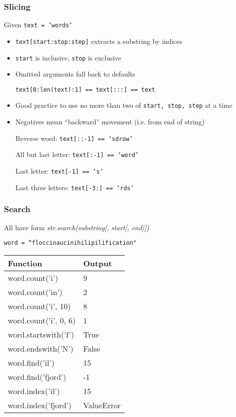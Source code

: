 \documentclass{beamer}
\begin{document}
%
%
\begin{frame}
  \frametitle{Slicing}

  Given \texttt{text = 'words'}

  \begin{itemize}
    \item \texttt{text[start:stop:step]} extracts a substring by indices
    \item \texttt{start} is inclusive, \texttt{stop} is exclusive
    \item Omitted arguments fall back to defaults

      \texttt{text[0:len(text):1] == text[:::] == text}

    \item Good practice to use no more than two of \texttt{start, stop, step} at a time

    \item Negatives mean ``backward'' movement (i.e. from end of string)
    
      Reverse word: \texttt{text[::-1] == `sdrow'}

      All but last letter: \texttt{text[:-1] == `word'}

      Last letter: \texttt{text[-1] == `s'}

      Last three letters: \texttt{text[-3:] == `rds'}
  \end{itemize}

\end{frame}

%
%
\begin{frame}
  \frametitle{Search}
  All have form \textit{str.search(substring[, start[, end]])}
  
  \texttt{word = ``floccinaucinihilipilification"}

  \begin{table}
    \begin{tabular}{l | l}
    Function & Output \\
    \hline
    word.count('i') & 9 \\
    word.count('in') & 2 \\
    word.count('i', 10) & 8 \\
    word.count('i', 0, 6) & 1 \\
    \hline
    word.startswith('f') & True \\
    word.endswith('N') & False \\
    \hline
    word.find('il') & 15 \\
    word.find('fjord') & -1 \\
    \hline
    word.index('il') & 15 \\
    word.index('fjord') & ValueError
   \end{tabular}
  \end{table}
\end{frame}
\end{document}
